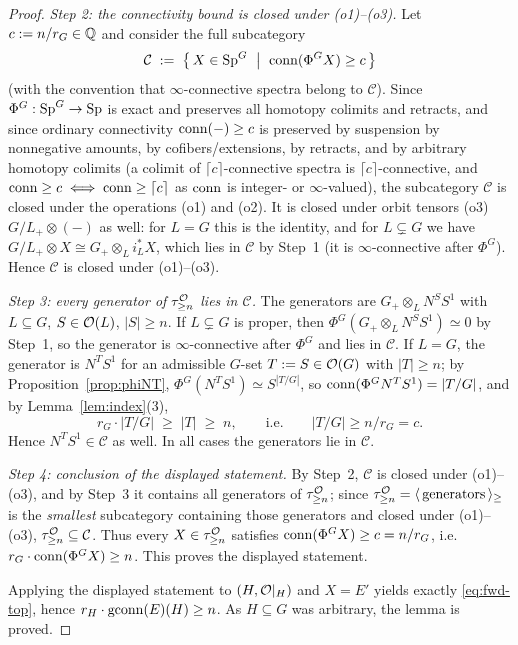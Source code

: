\begin{proof}
\emph{Step 2: the connectivity bound is closed under (o1)--(o3).}
Let $c:=n/r_G\in\mathbb{Q}$ and consider the full subcategory
\[
\mathcal C\;:=\;\bigl\{\,X\in\mathrm{Sp}^G \ \bigm|\ \operatorname{conn}(\Phi^G X)\ge c\,\bigr\}
\]
(with the convention that $\infty$-connective spectra belong to $\mathcal C$).
Since $\Phi^G:\mathrm{Sp}^G\to\mathrm{Sp}$ is exact and preserves all homotopy colimits and
retracts, and since ordinary connectivity $\operatorname{conn}(-)\ge c$ is preserved by
suspension by nonnegative amounts, by cofibers/extensions, by retracts, and by
arbitrary homotopy colimits (a colimit of $\lceil c\rceil$-connective spectra is
$\lceil c\rceil$-connective, and $\operatorname{conn}\ge c\iff\operatorname{conn}\ge\lceil c\rceil$ as
$\operatorname{conn}$ is integer- or $\infty$-valued), the subcategory $\mathcal C$ is closed
under the operations (o1) and (o2). It is closed under
orbit tensors (o3) $G/L_+\otimes(-)$ as well: for $L=G$ this is the identity, and for
$L\subsetneq G$ we have $G/L_+\otimes X\cong G_+\otimes_L i_L^\ast X$, which lies in
$\mathcal C$ by Step~1 (it is $\infty$-connective after $\Phi^G$). Hence
$\mathcal C$ is closed under (o1)--(o3).

\emph{Step 3: every generator of $\tau^{\mathcal{O}}_{\ge n}$ lies in $\mathcal C$.}
The generators are $G_+\otimes_L N^S S^1$ with $L\subseteq G$, $S\in\mathcal{O}(L)$,
$|S|\ge n$. If $L\subsetneq G$ is proper, then $\Phi^G(G_+\otimes_L N^S S^1)\simeq 0$
by Step~1, so the generator is $\infty$-connective after $\Phi^G$ and lies in
$\mathcal C$. If $L=G$, the generator is $N^T S^1$ for an admissible $G$-set
$T:=S\in\mathcal{O}(G)$ with $|T|\ge n$; by Proposition~\ref{prop:phiNT},
$\Phi^G(N^T S^1)\simeq S^{|T/G|}$, so $\operatorname{conn}(\Phi^G N^T S^1)=|T/G|$, and by
Lemma~\ref{lem:index}(3),
\[
r_G\cdot|T/G|\;\ge\;|T|\;\ge\;n,\qquad\text{i.e.}\qquad |T/G|\ge n/r_G=c .
\]
Hence $N^T S^1\in\mathcal C$ as well. In all cases the generators lie in
$\mathcal C$.

\emph{Step 4: conclusion of the displayed statement.}
By Step~2, $\mathcal C$ is closed under (o1)--(o3), and by Step~3 it contains all generators of
$\tau^{\mathcal{O}}_{\ge n}$; since $\tau^{\mathcal{O}}_{\ge n}=\langle\,\text{generators}\,\rangle_{\ge}$ is the \emph{smallest}
subcategory containing those generators and closed under (o1)--(o3), $\tau^{\mathcal{O}}_{\ge n}\subseteq\mathcal C$.
Thus every $X\in\tau^{\mathcal{O}}_{\ge n}$ satisfies $\operatorname{conn}(\Phi^G X)\ge c=n/r_G$,
i.e.\ $r_G\cdot\operatorname{conn}(\Phi^G X)\ge n$. This proves the displayed statement.

Applying the displayed statement to $(H,\mathcal{O}|_H)$ and $X=E'$ yields exactly
\eqref{eq:fwd-top}, hence $r_H\cdot\operatorname{gconn}(E)(H)\ge n$. As $H\subseteq G$ was
arbitrary, the lemma is proved.
\end{proof}

